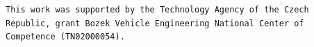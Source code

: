 \documentclass[sigconf]{aamas}
\begin{document}


\begin{acks}
\texttt{This work was supported by the Technology Agency of the Czech Republic, grant Bozek Vehicle Engineering National Center of Competence (TN02000054).}
\end{acks}



 
\balance


\end{document}

